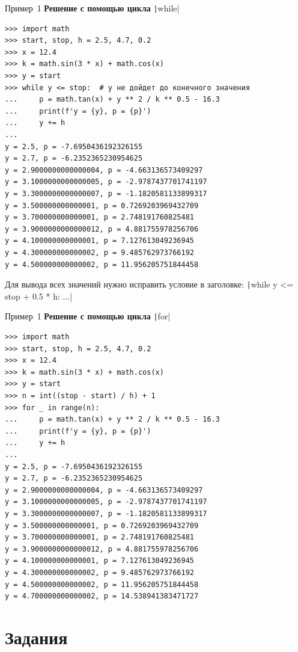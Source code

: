 \documentclass[aspectratio=169, mathserif]{beamer}	%
\begin{document}
\begin{frame}[fragile]{Пример~1}
\scriptsize
\textbf{Решение с помощью цикла} \texttt|while|
\begin{verbatim}
>>> import math
>>> start, stop, h = 2.5, 4.7, 0.2
>>> x = 12.4
>>> k = math.sin(3 * x) + math.cos(x)
>>> y = start
>>> while y <= stop:  # y не дойдет до конечного значения
...     p = math.tan(x) + y ** 2 / k ** 0.5 - 16.3
...     print(f'y = {y}, p = {p}')
...     y += h
...
y = 2.5, p = -7.6950436192326155
y = 2.7, p = -6.2352365230954625
y = 2.9000000000000004, p = -4.663136573409297
y = 3.1000000000000005, p = -2.9787437701741197
y = 3.3000000000000007, p = -1.1820581133899317
y = 3.500000000000001, p = 0.7269203969432709
y = 3.700000000000001, p = 2.748191760825481
y = 3.9000000000000012, p = 4.881755978256706
y = 4.100000000000001, p = 7.127613049236945
y = 4.300000000000002, p = 9.485762973766192
y = 4.500000000000002, p = 11.956205751844458
\end{verbatim}
Для вывода всех значений нужно исправить условие в заголовке: \texttt|while y <= stop + 0.5 * h: ...|
\vfill
\end{frame}

\begin{frame}[fragile]{Пример~1}
\scriptsize
\textbf{Решение с помощью цикла} \texttt|for|
\begin{verbatim}
>>> import math
>>> start, stop, h = 2.5, 4.7, 0.2
>>> x = 12.4
>>> k = math.sin(3 * x) + math.cos(x)
>>> y = start
>>> n = int((stop - start) / h) + 1
>>> for _ in range(n):
...     p = math.tan(x) + y ** 2 / k ** 0.5 - 16.3
...     print(f'y = {y}, p = {p}')
...     y += h
...
y = 2.5, p = -7.6950436192326155
y = 2.7, p = -6.2352365230954625
y = 2.9000000000000004, p = -4.663136573409297
y = 3.1000000000000005, p = -2.9787437701741197
y = 3.3000000000000007, p = -1.1820581133899317
y = 3.500000000000001, p = 0.7269203969432709
y = 3.700000000000001, p = 2.748191760825481
y = 3.9000000000000012, p = 4.881755978256706
y = 4.100000000000001, p = 7.127613049236945
y = 4.300000000000002, p = 9.485762973766192
y = 4.500000000000002, p = 11.956205751844458
y = 4.700000000000002, p = 14.538941383471727
\end{verbatim}
\vfill
\end{frame}


\section{Задания}
\sectionframe
\end{document}
